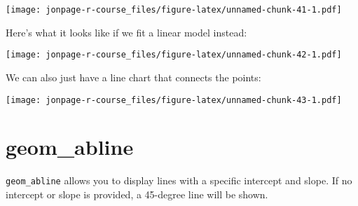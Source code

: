 \documentclass[]{book}
\newenvironment{Shaded}{\begin{snugshade}}{\end{snugshade}}
\newcommand{\KeywordTok}[1]{\textcolor[rgb]{0.13,0.29,0.53}{\textbf{{#1}}}}
\newcommand{\DataTypeTok}[1]{\textcolor[rgb]{0.13,0.29,0.53}{{#1}}}
\newcommand{\DecValTok}[1]{\textcolor[rgb]{0.00,0.00,0.81}{{#1}}}
\newcommand{\FloatTok}[1]{\textcolor[rgb]{0.00,0.00,0.81}{{#1}}}
\newcommand{\StringTok}[1]{\textcolor[rgb]{0.31,0.60,0.02}{{#1}}}
\newcommand{\NormalTok}[1]{{#1}}
\theoremstyle{definition}
\theoremstyle{definition}
\theoremstyle{remark}
\begin{document}
\texttt{[image: jonpage-r-course\_files/figure-latex/unnamed-chunk-41-1.pdf]}

Here's what it looks like if we fit a linear model instead:

\begin{Shaded}
\end{Shaded}

\texttt{[image: jonpage-r-course\_files/figure-latex/unnamed-chunk-42-1.pdf]}

We can also just have a line chart that connects the points:

\begin{Shaded}
\end{Shaded}

\texttt{[image: jonpage-r-course\_files/figure-latex/unnamed-chunk-43-1.pdf]}

\section{geom\_abline}\label{geom_abline}

\texttt{geom\_abline} allows you to display lines with a specific
intercept and slope. If no intercept or slope is provided, a 45-degree
line will be shown.

\begin{Shaded}
\end{Shaded}
\end{document}
